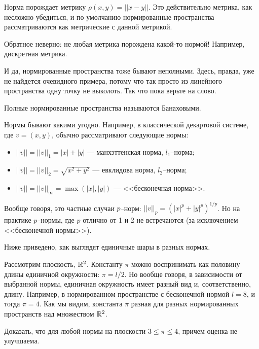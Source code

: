 \begin{Statement}
Норма порождает метрику $\rho(x, y) = ||x - y||$. Это действительно метрика, как несложно убедиться, и по умолчанию нормированные пространства рассматриваются как метрические с данной метрикой.
\end{Statement}

\begin{Comment}
Обратное неверно: не любая метрика порождена какой-то нормой! Например, дискретная метрика.
\end{Comment}

И да, нормированные пространства тоже бывают неполными. Здесь, правда, уже не найдется очевидного примера, потому что так просто из линейного пространства одну точку не выколоть. Так что пока верьте на слово.
\begin{Def}
Полные нормированные пространства называются Банаховыми.
\end{Def}

Нормы бывают какими угодно. Например, в классической декартовой системе, где $v = (x, y)$, обычно рассматривают следующие нормы:
\begin{itemize}
\item $||v|| = ||v||_1 = |x| + |y|$ --- манхэттенская норма, $l_1$--норма;
\item $||v|| = ||v||_2 = \sqrt{x^2 + y^2}$ --- евклидова норма, $l_2$--норма;
\item $||v|| = ||v||_\infty = \max(|x|, |y|)$ --- <<бесконечная норма>>.
\end{itemize}

Вообще говоря, это частные случаи $p$--норм: $||v||_p = (|x|^p + |y|^p)^{1/p}$. Но на практике $p$--нормы, где $p$ отлично от 1 и 2 не встречаются (за исключением <<бесконечной нормы>>).

Ниже приведено, как выглядят единичные шары в разных нормах.
\begin{figure}[H]
\begin{minipage}[h]{0.47\linewidth}
\end{minipage}
\hfill
\begin{minipage}[h]{0.47\linewidth}
\end{minipage}
\end{figure}

\begin{Task}
Рассмотрим плоскость, $\mathbb{R}^2$. Константу $\pi$ можно воспринимать как половину длины единичной окружности: $\pi = l/2$. Но вообще говоря, в зависимости от выбранной нормы, единичная окружность имеет разный вид и, соответственно, длину. Например, в нормированном пространстве с бесконечной нормой $l = 8$, и тогда $\pi = 4$. Как мы видим, константа $\pi$ разная для разных нормированных пространств над множеством $\mathbb{R}^2$.

Доказать, что для любой нормы на плоскости $3 \leq \pi \leq 4$, причем оценка не улучшаема.
\end{Task}

